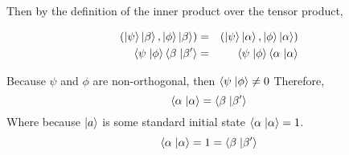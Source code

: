 \documentclass[11pt,fleqn]{article}
\begin{document}
\begin{enumerate}
Then by the definition of the inner product over the tensor product,

\begin{eqnarray}
(\ket{\psi}\ket{\beta}, \ket{\phi}\ket{\beta}) &=&  (\ket{\psi}\ket{\alpha}, \ket{\phi}\ket{\alpha}) \\
\braket{\psi}{\phi}\braket{\beta}{\beta'} &=& \braket{\psi}{\phi}\braket{\alpha}{\alpha}
\end{eqnarray}

Because $\psi$ and $\phi$ are non-orthogonal, then $\braket{\psi}{\phi} \ne 0$
Therefore, 
\[
\braket{\alpha}{\alpha} = \braket{\beta}{\beta'}
\]
Where because $\ket{a}$ is some standard initial state $\braket{\alpha}{\alpha}=1$.
\[
\braket{\alpha}{\alpha} = 1 = \braket{\beta}{\beta'}
\]




\end{enumerate}
\end{document}

